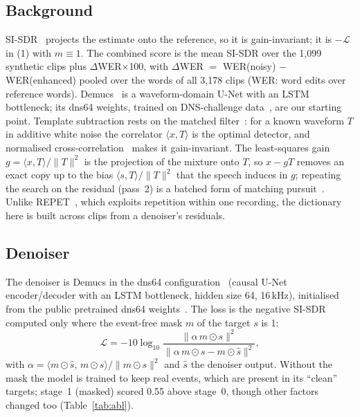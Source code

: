 \documentclass[conference]{IEEEtran}
\begin{document}
\subsection{Background}
SI\nobreakdash-SDR~\cite{sisdr} projects the estimate onto the reference, so it is gain-invariant; it is
$-\mathcal{L}$ in (1) with $m\equiv1$. The combined score is the mean SI\nobreakdash-SDR over the 1,099 synthetic
clips plus $\Delta$WER$\times$100, with $\Delta$WER $=$ WER(noisy) $-$ WER(enhanced) pooled over the words of all
3,178 clips (WER: word edits over reference words). Demucs~\cite{demucs} is a waveform-domain U-Net with an LSTM
bottleneck; its dns64 weights, trained on DNS-challenge data~\cite{dns}, are our starting point. Template subtraction
rests on the matched filter~\cite{turin}: for a known waveform $T$ in additive white noise the correlator
$\langle x,T\rangle$ is the optimal detector, and normalised cross-correlation~\cite{lewis} makes it gain-invariant.
The least-squares gain $g=\langle x,T\rangle/\lVert T\rVert^2$ is the projection of the mixture onto $T$, so $x-gT$
removes an exact copy up to the bias $\langle s,T\rangle/\lVert T\rVert^2$ that the speech induces in $g$;
repeating the search on the residual (pass~2) is a batched form of matching pursuit~\cite{mallat}. Unlike
REPET~\cite{repet}, which exploits repetition within one recording, the dictionary here is built across clips from a
denoiser's residuals.

\subsection{Denoiser}\label{sec:den}
The denoiser is Demucs in the dns64 configuration~\cite{demucs} (causal U-Net encoder/decoder with an LSTM bottleneck,
hidden size 64, 16\,kHz), initialised from the public pretrained dns64 weights~\cite{denoiserrepo}. The loss is the
negative SI\nobreakdash-SDR~\cite{sisdr} computed only where the event-free mask $m$ of the target $s$ is 1:
\begin{equation}
\mathcal{L} = -10\log_{10}\frac{\lVert \alpha\, m\odot s\rVert^2}{\lVert \alpha\, m\odot s - m\odot\hat{s}\rVert^2},
\end{equation}
with $\alpha=\langle m\odot\hat{s},\, m\odot s\rangle/\lVert m\odot s\rVert^2$ and $\hat{s}$ the denoiser output.
Without the mask the model is trained to keep real events, which are present in its ``clean'' targets; stage~1
(masked) scored 0.55 above stage~0, though other factors changed too (Table~\ref{tab:abl}).
\end{document}
